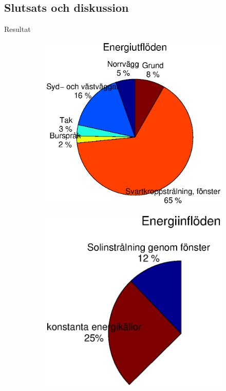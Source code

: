 \subsection{Slutsats och diskussion}

\begin{frame}{Resultat}


\begin{figure}
        \begin{subfigure}[b]{0.48\textwidth}
                \centering
                \includegraphics[width=\textwidth]{images/totalflow_out.eps}
        \end{subfigure}
        \begin{subfigure}[b]{0.48\textwidth}
                \centering
                \includegraphics[width=\textwidth]{images/totalflow_in.eps}
        \end{subfigure}
\end{figure}

\end{frame}
